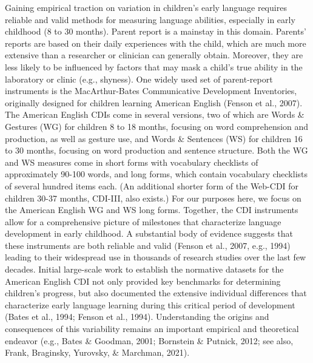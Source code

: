 \documentclass[
  english,
  ,man,floatsintext]{apa6}
\begin{document}
Gaining empirical traction on variation in children's early language requires reliable and valid methods for measuring language abilities, especially in early childhood (8 to 30 months). Parent report is a mainstay in this domain. Parents' reports are based on their daily experiences with the child, which are much more extensive than a researcher or clinician can generally obtain. Moreover, they are less likely to be influenced by factors that may mask a child's true ability in the laboratory or clinic (e.g., shyness). One widely used set of parent-report instruments is the MacArthur-Bates Communicative Development Inventories, originally designed for children learning American English (Fenson et al., 2007). The American English CDIs come in several versions, two of which are Words \& Gestures (WG) for children 8 to 18 months, focusing on word comprehension and production, as well as gesture use, and Words \& Sentences (WS) for children 16 to 30 months, focusing on word production and sentence structure. Both the WG and WS measures come in short forms with vocabulary checklists of approximately 90-100 words, and long forms, which contain vocabulary checklists of several hundred items each. (An additional shorter form of the Web-CDI for children 30-37 months, CDI-III, also exists.) For our purposes here, we focus on the American English WG and WS long forms. Together, the CDI instruments allow for a comprehensive picture of milestones that characterize language development in early childhood. A substantial body of evidence suggests that these instruments are both reliable and valid (Fenson et al., 2007, e.g., 1994) leading to their widespread use in thousands of research studies over the last few decades. Initial large-scale work to establish the normative datasets for the American English CDI not only provided key benchmarks for determining children's progress, but also documented the extensive individual differences that characterize early language learning during this critical period of development (Bates et al., 1994; Fenson et al., 1994). Understanding the origins and consequences of this variability remains an important empirical and theoretical endeavor (e.g., Bates \& Goodman, 2001; Bornstein \& Putnick, 2012; see also, Frank, Braginsky, Yurovsky, \& Marchman, 2021).
\end{document}
